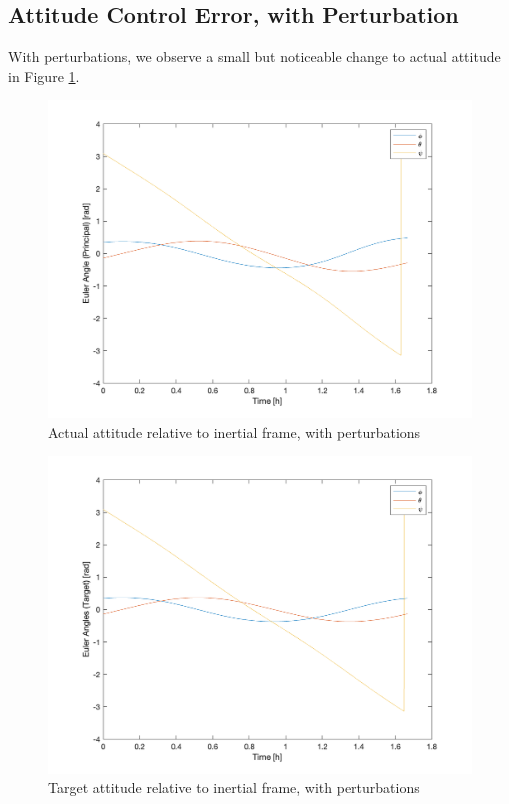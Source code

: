 \subsection{Attitude Control Error, with Perturbation}
With perturbations, we observe a small but noticeable change to actual attitude in Figure \ref{fig:Images/ps6_problem3_principal}.

\begin{figure}[H]
\centering
\includegraphics[scale=0.6]{Images/ps6_problem3_principal.png}
\caption{Actual attitude relative to inertial frame, with perturbations}
\label{fig:Images/ps6_problem3_principal}
\end{figure}

\begin{figure}[H]
\centering
\includegraphics[scale=0.6]{Images/ps6_problem3_target.png}
\caption{Target attitude relative to inertial frame, with perturbations}
\label{fig:Images/ps6_problem3_target}
\end{figure}

